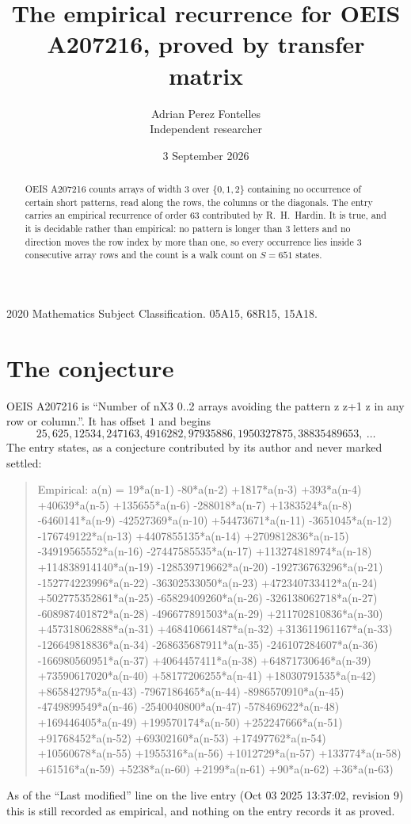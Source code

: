 \documentclass[11pt,a4paper]{article}
\title{The empirical recurrence for OEIS A207216, proved by transfer matrix}
\author{Adrian Perez Fontelles\\ \small Independent researcher}
\date{3 September 2026}
\theoremstyle{plain}
\theoremstyle{definition}
\begin{document}
\maketitle

\begin{abstract}
OEIS A207216 counts arrays of width $3$ over $\{0,1,2\}$ containing no occurrence of certain short
patterns, read along the rows, the columns or the diagonals. The entry carries an empirical
recurrence of order $63$ contributed by R.~H.~Hardin. It is true, and it is decidable
rather than empirical: no pattern is longer than $3$ letters and no direction moves the row
index by more than one, so every occurrence lies inside $3$ consecutive array rows and the
count is a walk count on $S=651$ states.
\end{abstract}

\noindent\small 2020 Mathematics Subject Classification. 05A15, 68R15, 15A18.\normalsize

\section{The conjecture}

OEIS A207216 is ``Number of nX3 0..2 arrays avoiding the pattern z z+1 z in any row or column.''. It has offset $1$ and begins
\[
25, 625, 12534, 247163, 4916282, 97935886, 1950327875, 38835489653,\ \dots
\]
The entry states, as a conjecture contributed by its author and never marked settled:
\begin{quote}
Empirical: a(n) = 19*a(n-1) -80*a(n-2) +1817*a(n-3) +393*a(n-4) +40639*a(n-5) +135655*a(n-6) -288018*a(n-7) +1383524*a(n-8) -6460141*a(n-9) -42527369*a(n-10) +54473671*a(n-11) -3651045*a(n-12) -176749122*a(n-13) +4407855135*a(n-14) +2709812836*a(n-15) -34919565552*a(n-16) -27447585535*a(n-17) +113274818974*a(n-18) +114838914140*a(n-19) -128539719662*a(n-20) -192736763296*a(n-21) -152774223996*a(n-22) -36302533050*a(n-23) +472340733412*a(n-24) +502775352861*a(n-25) -65829409260*a(n-26) -326138062718*a(n-27) -608987401872*a(n-28) -496677891503*a(n-29) +211702810836*a(n-30) +457318062888*a(n-31) +468410661487*a(n-32) +313611961167*a(n-33) -126649818836*a(n-34) -268635687911*a(n-35) -246107284607*a(n-36) -166980560951*a(n-37) +4064457411*a(n-38) +64871730646*a(n-39) +73590617020*a(n-40) +58177206255*a(n-41) +18030791535*a(n-42) +865842795*a(n-43) -7967186465*a(n-44) -8986570910*a(n-45) -4749899549*a(n-46) -2540040800*a(n-47) -578469622*a(n-48) +169446405*a(n-49) +199570174*a(n-50) +252247666*a(n-51) +91768452*a(n-52) +69302160*a(n-53) +17497762*a(n-54) +10560678*a(n-55) +1955316*a(n-56) +1012729*a(n-57) +133774*a(n-58) +61516*a(n-59) +5238*a(n-60) +2199*a(n-61) +90*a(n-62) +36*a(n-63)
\end{quote}
As of the ``Last modified'' line on the live entry (Oct 03 2025 13:37:02, revision 9) this is still
recorded as empirical, and nothing on the entry records it as proved.
\end{document}
